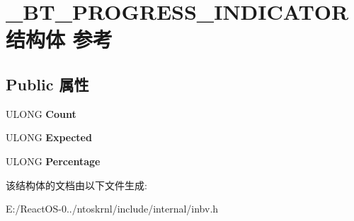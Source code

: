 \hypertarget{struct___b_t___p_r_o_g_r_e_s_s___i_n_d_i_c_a_t_o_r}{}\section{\+\_\+\+B\+T\+\_\+\+P\+R\+O\+G\+R\+E\+S\+S\+\_\+\+I\+N\+D\+I\+C\+A\+T\+O\+R结构体 参考}
\label{struct___b_t___p_r_o_g_r_e_s_s___i_n_d_i_c_a_t_o_r}
\subsection*{Public 属性}
\begin{DoxyCompactItemize}
\item 
\mbox{\label{struct___b_t___p_r_o_g_r_e_s_s___i_n_d_i_c_a_t_o_r_a5dd5e14b8fb2f4e67d1eca97b2c6a7b9}} 
U\+L\+O\+NG {\bfseries Count}
\item 
\mbox{\label{struct___b_t___p_r_o_g_r_e_s_s___i_n_d_i_c_a_t_o_r_ae627ed9acffa065427665ab2c014e2ff}} 
U\+L\+O\+NG {\bfseries Expected}
\item 
\mbox{\label{struct___b_t___p_r_o_g_r_e_s_s___i_n_d_i_c_a_t_o_r_addf5266bf409bec628d30eb120dd917c}} 
U\+L\+O\+NG {\bfseries Percentage}
\end{DoxyCompactItemize}


该结构体的文档由以下文件生成\+:\begin{DoxyCompactItemize}
\item 
E\+:/\+React\+O\+S-\/0../ntoskrnl/include/internal/inbv.\+h\end{DoxyCompactItemize}
